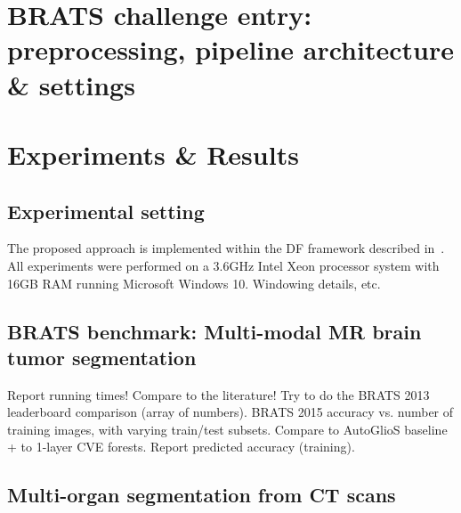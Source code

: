 
\section{BRATS challenge entry: preprocessing, pipeline architecture \& settings}

\section{Experiments \& Results}
\label{sec: results}

\subsection{Experimental setting}

The proposed approach is implemented within the DF framework described in~\cite{zikic2012decision}. All experiments were performed on a 
3.6GHz Intel Xeon processor system with 16GB RAM running Microsoft Windows 10.
Windowing details, etc.


\subsection{BRATS benchmark: Multi-modal MR brain tumor segmentation}

Report running times! Compare to the literature! Try to do the BRATS 2013 leaderboard comparison (array of numbers). BRATS 2015 accuracy vs. number of training images, with varying train/test subsets. Compare to AutoGlioS baseline + to 1-layer CVE forests. Report predicted accuracy (training).

\subsection{Multi-organ segmentation from CT scans}
